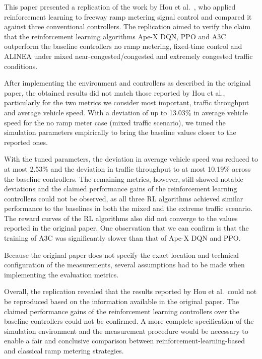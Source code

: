 This paper presented a replication of the work by Hou et al.\ \cite{hou2021rampmeter},
who applied reinforcement learning to freeway ramp metering signal control
and compared it against three conventional controllers.
The replication aimed to verify the claim that the reinforcement learning algorithms
Ape-X DQN, PPO and A3C outperform the baseline controllers
no ramp metering, fixed-time control and ALINEA
under mixed near-congested/congested and extremely congested traffic conditions.

\medskip

After implementing the environment and controllers as described in the original paper,
the obtained results did not match those reported by Hou et al.,
particularly for the two metrics we consider most important, 
traffic throughput and average vehicle speed.
With a deviation of up to 13.03\% in average vehicle speed for the no ramp meter case (mixed traffic scenario),
we tuned the simulation parameters empirically to bring the baseline values closer to the reported ones.

\medskip

With the tuned parameters, the deviation in average vehicle speed was reduced to at most 2.53\% and the deviation in traffic throughput to at most 10.19\%
across the baseline controllers. The remaining metrics, however, still showed notable deviations
and the claimed performance gains of the reinforcement learning controllers could not be observed, as
all three RL algorithms achieved similar performance to the baselines in both the mixed and the extreme traffic scenario.
The reward curves of the RL algorithms also did not converge to the values reported in the original paper.
One observation that we can confirm is that the training of A3C was significantly slower
than that of Ape-X DQN and PPO.

\medskip

Because the original paper does not specify the exact location and technical configuration of the measurements,
several assumptions had to be made when implementing the evaluation metrics.

\medskip

Overall, the replication revealed that the results reported by Hou et al.\ could not be reproduced
based on the information available in the original paper.
The claimed performance gains of the reinforcement learning controllers
over the baseline controllers could not be confirmed.
A more complete specification of the simulation environment and the measurement procedure would be necessary to enable a fair and conclusive comparison
between reinforcement-learning-based and classical ramp metering strategies.

